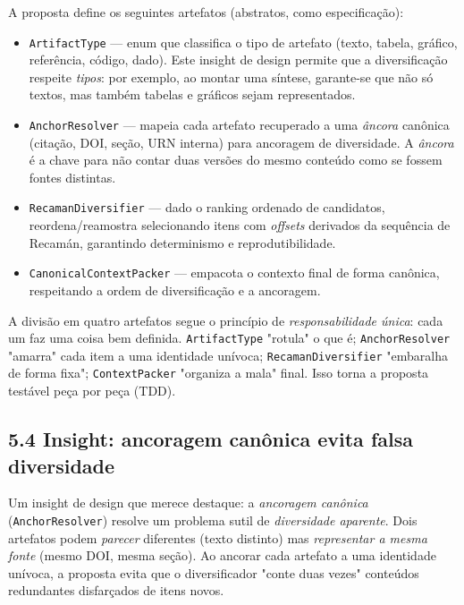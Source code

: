  A proposta define os seguintes artefatos (abstratos, como especificação):

\begin{itemize}
  \item \texttt{ArtifactType} --- enum que classifica o tipo de artefato
        (texto, tabela, gráfico, referência, código, dado). Este insight de design
        permite que a diversificação respeite \emph{tipos}: por exemplo, ao montar
        uma síntese, garante-se que não só textos, mas também tabelas e gráficos
        sejam representados.
  \item \texttt{AnchorResolver} --- mapeia cada artefato recuperado a uma
        \emph{âncora} canônica (citação, DOI, seção, URN interna) para ancoragem
        de diversidade. A \emph{âncora} é a chave para não contar duas versões do
        mesmo conteúdo como se fossem fontes distintas.
  \item \texttt{RecamanDiversifier} --- dado o ranking ordenado de candidatos,
        reordena/reamostra selecionando itens com \emph{offsets} derivados da
        sequência de Recamán, garantindo determinismo e reprodutibilidade.
  \item \texttt{CanonicalContextPacker} --- empacota o contexto final de forma
        canônica, respeitando a ordem de diversificação e a ancoragem.
\end{itemize}

\begin{intuicao}
A divisão em quatro artefatos segue o princípio de \emph{responsabilidade única}:
cada um faz uma coisa bem definida. \texttt{ArtifactType} "rotula" o que é;
\texttt{AnchorResolver} "amarra" cada item a uma identidade unívoca;
\texttt{RecamanDiversifier} "embaralha de forma fixa"; \texttt{ContextPacker}
"organiza a mala" final. Isso torna a proposta testável peça por peça (TDD).
\end{intuicao}

\subsection*{5.4 Insight: ancoragem canônica evita falsa diversidade}

 Um insight de design que merece destaque: a \emph{ancoragem canônica}
(\texttt{AnchorResolver}) resolve um problema sutil de \emph{diversidade aparente}.
Dois artefatos podem \emph{parecer} diferentes (texto distinto) mas
\emph{representar a mesma fonte} (mesmo DOI, mesma seção). Ao ancorar cada
artefato a uma identidade unívoca, a proposta evita que o diversificador
"conte duas vezes" conteúdos redundantes disfarçados de itens novos.

